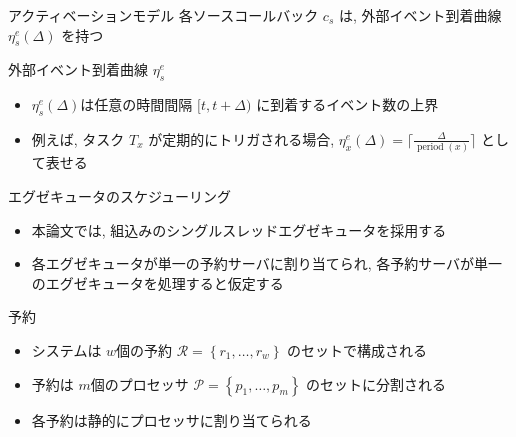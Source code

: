 \begin{frame}{アクティベーションモデル}
    各ソースコールバック $c_{s}$ は, 外部イベント到着曲線 $\eta_{s}^{e}(\Delta)$ を持つ
    \begin{block}{外部イベント到着曲線 $\eta_{s}^{e}$}
        \setlength{\linewidth}{0.98\columnwidth}
        \begin{itemize}
        \item $\eta_{s}^{e}(\Delta)$は任意の時間間隔 $[t, t+\Delta)$ に到着するイベント数の上界
        \item 例えば, タスク $T_{x}$ が定期的にトリガされる場合, $\eta_{x}^{e}(\Delta)=\lceil\frac{\Delta}{\operatorname{period}(x)}\rceil$ として表せる
        \end{itemize}
    \end{block}
\end{frame}

\begin{frame}{エグゼキュータのスケジューリング}
    \begin{itemize}
        \item 本論文では, 組込みのシングルスレッドエグゼキュータを採用する
        \item 各エグゼキュータが単一の予約サーバに割り当てられ, 各予約サーバが単一のエグゼキュータを処理すると仮定する
    \end{itemize}
\end{frame}

\begin{frame}{予約}
    \begin{itemize}
        \item システムは $w$個の予約 $\mathcal{R}=\left\{r_{1}, \ldots, r_{w}\right\}$ のセットで構成される
        \item 予約は $m$個のプロセッサ $\mathcal{P}=\left\{p_{1}, \ldots, p_{m}\right\}$ のセットに分割される
        \item 各予約は静的にプロセッサに割り当てられる
    \end{itemize}
\end{frame}

